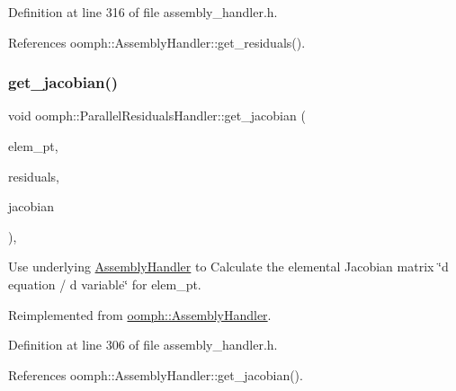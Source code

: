 Definition at line 316 of file assembly\+\_\+handler.\+h.



References oomph\+::\+Assembly\+Handler\+::get\+\_\+residuals().

\mbox{\label{classoomph_1_1ParallelResidualsHandler_a366186bb0905d7251390ec726fe33797}} 
\subsubsection{\texorpdfstring{get\+\_\+jacobian()}{get\_jacobian()}}
{\footnotesize\ttfamily void oomph\+::\+Parallel\+Residuals\+Handler\+::get\+\_\+jacobian (\begin{DoxyParamCaption}\item[{\hyperlink{classoomph_1_1GeneralisedElement}{Generalised\+Element} $\ast$const \&}]{elem\+\_\+pt,  }\item[{\hyperlink{classoomph_1_1Vector}{Vector}$<$ double $>$ \&}]{residuals,  }\item[{\hyperlink{classoomph_1_1DenseMatrix}{Dense\+Matrix}$<$ double $>$ \&}]{jacobian }\end{DoxyParamCaption})\hspace{0.3cm}{\ttfamily [inline]}, {\ttfamily [virtual]}}



Use underlying \hyperlink{classoomph_1_1AssemblyHandler}{Assembly\+Handler} to Calculate the elemental Jacobian matrix \char`\"{}d equation 
/ d variable\char`\"{} for elem\+\_\+pt. 



Reimplemented from \hyperlink{classoomph_1_1AssemblyHandler_ad43c3d8760be0ba6ebee8d82509458e5}{oomph\+::\+Assembly\+Handler}.



Definition at line 306 of file assembly\+\_\+handler.\+h.



References oomph\+::\+Assembly\+Handler\+::get\+\_\+jacobian().

\mbox{\label{classoomph_1_1ParallelResidualsHandler_a9a4e40b86cfb1db2b4c770d8d7241ad1}} 

